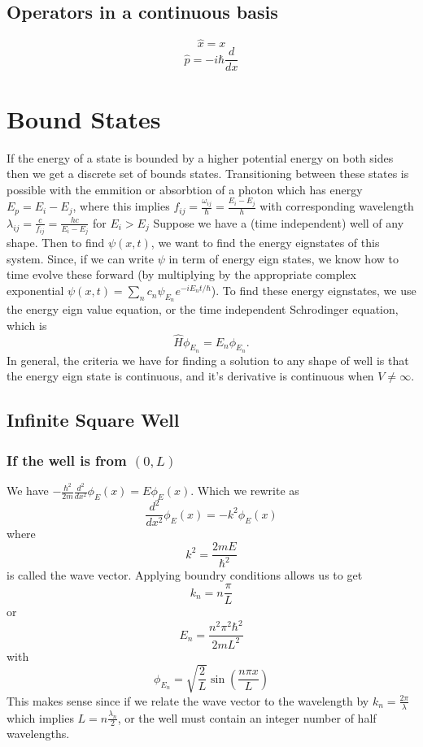 \documentclass{homework}
\begin{document}
\subsection{Operators in a continuous basis}

\[\hat{x} = x\]
\[\hat{p} = -i\hbar \frac{d}{dx}\]

\section{Bound States}
If the energy of a state is bounded by a higher potential energy on both sides then we get a discrete set of bounds states. Transitioning between these states is possible with the emmition or absorbtion of a photon which has energy $E_p = E_i - E_j$, where this implies $f_{ij} = \frac{\omega_{ij}}{\hbar} = \frac{E_i - E_j}{h} $ with corresponding wavelength $\lambda_{ij} = \frac{c}{f_{ij}} = \frac{hc}{E_i - E_j}$ for $E_i > E_j$
Suppose we have a (time independent) well of any shape. Then to find $\psi(x,t)$, we want to find the energy eignstates of this system. Since, if we can write $\psi$ in term of energy eign states, we know how to time evolve these forward (by multiplying by the appropriate complex exponential $\psi(x,t) = \sum_n c_n \psi_{E_n}e^{-iE_nt/\hbar}$). To find these energy eignstates, we use the energy eign value equation, or the time independent Schrodinger equation, which is
\[\hat{H}\phi_{E_n} = E_n\phi_{E_n}.\]
In general, the criteria we have for finding a solution to any shape of well is that the energy eign state is continuous, and it's derivative is continuous when $V \neq \infty$. 

\subsection{Infinite Square Well}

\subsubsection{If the well is from $(0,L)$}

We have $-\frac{\hbar^2}{2m}\frac{d^2}{dx^2}\phi_E(x) = E \phi_E(x)$. Which we rewrite as 
\[\frac{d^2}{dx^2}\phi_E(x) = -k^2 \phi_E(x)\]
where 
\[k^2 = \frac{2mE}{\hbar^2}\]
is called the wave vector. Applying boundry conditions allows us to get
\[k_n = n\frac{\pi}{L}\]
or
\[E_n = \frac{n^2\pi^2\hbar^2}{2mL^2}\]
with
\[\phi_{E_n} = \sqrt{\frac{2}{L}}\sin \left(\frac{n\pi x}{L}\right)\]
This makes sense since if we relate the wave vector to the wavelength by $k_n = \frac{2\pi}{\lambda}$ which implies $L = n\frac{\lambda_n}{2}$, or the well must contain an integer number of half wavelengths. 
\end{document}
